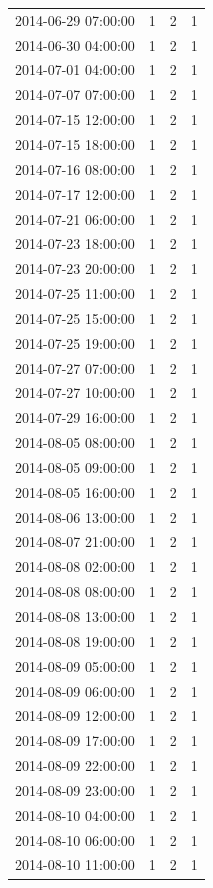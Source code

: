 \begin{tabular}{lrrr}
2014-06-29 07:00:00 & 1 & 2 & 1 \\
2014-06-30 04:00:00 & 1 & 2 & 1 \\
2014-07-01 04:00:00 & 1 & 2 & 1 \\
2014-07-07 07:00:00 & 1 & 2 & 1 \\
2014-07-15 12:00:00 & 1 & 2 & 1 \\
2014-07-15 18:00:00 & 1 & 2 & 1 \\
2014-07-16 08:00:00 & 1 & 2 & 1 \\
2014-07-17 12:00:00 & 1 & 2 & 1 \\
2014-07-21 06:00:00 & 1 & 2 & 1 \\
2014-07-23 18:00:00 & 1 & 2 & 1 \\
2014-07-23 20:00:00 & 1 & 2 & 1 \\
2014-07-25 11:00:00 & 1 & 2 & 1 \\
2014-07-25 15:00:00 & 1 & 2 & 1 \\
2014-07-25 19:00:00 & 1 & 2 & 1 \\
2014-07-27 07:00:00 & 1 & 2 & 1 \\
2014-07-27 10:00:00 & 1 & 2 & 1 \\
2014-07-29 16:00:00 & 1 & 2 & 1 \\
2014-08-05 08:00:00 & 1 & 2 & 1 \\
2014-08-05 09:00:00 & 1 & 2 & 1 \\
2014-08-05 16:00:00 & 1 & 2 & 1 \\
2014-08-06 13:00:00 & 1 & 2 & 1 \\
2014-08-07 21:00:00 & 1 & 2 & 1 \\
2014-08-08 02:00:00 & 1 & 2 & 1 \\
2014-08-08 08:00:00 & 1 & 2 & 1 \\
2014-08-08 13:00:00 & 1 & 2 & 1 \\
2014-08-08 19:00:00 & 1 & 2 & 1 \\
2014-08-09 05:00:00 & 1 & 2 & 1 \\
2014-08-09 06:00:00 & 1 & 2 & 1 \\
2014-08-09 12:00:00 & 1 & 2 & 1 \\
2014-08-09 17:00:00 & 1 & 2 & 1 \\
2014-08-09 22:00:00 & 1 & 2 & 1 \\
2014-08-09 23:00:00 & 1 & 2 & 1 \\
2014-08-10 04:00:00 & 1 & 2 & 1 \\
2014-08-10 06:00:00 & 1 & 2 & 1 \\
2014-08-10 11:00:00 & 1 & 2 & 1 \\

\end{tabular}

